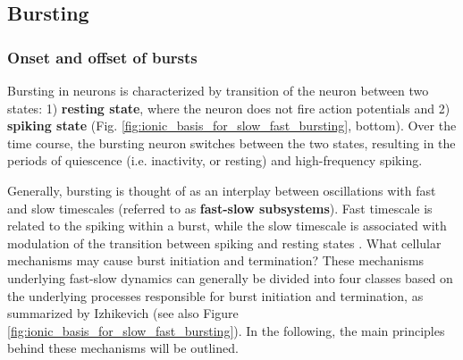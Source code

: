 \documentclass[../main.tex]{subfiles}
\begin{document}

\subsection{Bursting}

\subsubsection{Onset and offset of bursts} \label{subsubsec:bio_burst_onset_offset}

Bursting in neurons is characterized by transition of the neuron between two states: 1) \textbf{resting state}, where the neuron does not fire action potentials and 2) \textbf{spiking state} (Fig. \ref{fig:ionic_basis_for_slow_fast_bursting}, bottom). Over the time course, the bursting neuron switches between the two states, resulting in the periods of quiescence (i.e. inactivity, or resting) and high-frequency spiking.

Generally, bursting is thought of as an interplay between oscillations with fast and slow timescales (referred to as \textbf{fast-slow subsystems}). Fast timescale is related to the spiking within a burst, while the slow timescale is associated with modulation of the transition between spiking and resting states \parencite{izhikevichDynamicalSystemsNeuroscience2006}. What cellular mechanisms may cause burst initiation and termination? These mechanisms underlying fast-slow dynamics can generally be divided into four classes based on the underlying processes responsible for burst initiation and termination, as summarized by Izhikevich \parencite{izhikevichDynamicalSystemsNeuroscience2006} (see also Figure \ref{fig:ionic_basis_for_slow_fast_bursting}). In the following, the main principles behind these mechanisms will be outlined.
\end{document}
